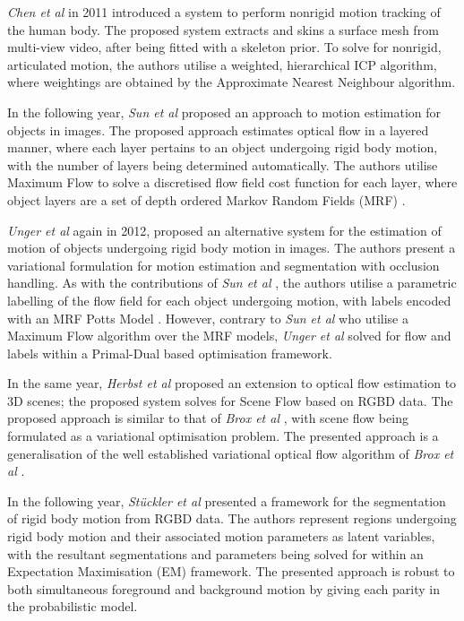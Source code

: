 {\textit{Chen et al} \cite{Chen2011} in 2011 introduced a system to perform nonrigid motion 
tracking of the human body. The proposed system extracts and skins a surface mesh from 
multi-view video, after being fitted with a skeleton prior. To solve for nonrigid, articulated 
motion, the authors utilise a weighted, hierarchical ICP algorithm, where weightings are obtained 
by the Approximate Nearest Neighbour \cite{Indyk2000} algorithm.

In the following year, \textit{Sun et al} \cite{Sun2012} proposed an approach to motion estimation 
for objects in images. The proposed approach estimates optical flow in a layered manner, where each 
layer pertains to an object undergoing rigid body motion, with the number of layers being determined 
automatically. The authors utilise Maximum Flow \cite{Lamich2017} to solve a discretised flow field cost 
function for each layer, where object layers are a set of depth ordered Markov Random Fields (MRF) 
\cite{BishopPRML, Murphy2012ML}.

\textit{Unger et al} \cite{Unger2012} again in 2012, proposed an alternative system for the 
estimation of motion of objects undergoing rigid body motion in images. The authors present a 
variational formulation for motion estimation and segmentation with occlusion handling. As with 
the contributions of \textit{Sun et al} \cite{Sun2012}, the authors utilise a parametric labelling 
of the flow field for each object undergoing motion, with labels encoded with an MRF Potts Model 
\cite{Levada2008}. However, contrary to \textit{Sun et al} \cite{Sun2012} who utilise a Maximum Flow 
algorithm over the MRF models, \textit{Unger et al} solved for flow and labels within a Primal-Dual 
\cite{Boyd2004Convex} based optimisation framework.

In the same year, \textit{Herbst et al} \cite{Herbst2013} proposed an extension to optical 
flow estimation to 3D scenes; the proposed system solves for Scene Flow based on RGBD data. 
The proposed approach is similar to that of \textit{Brox et al} \cite{Brox2004}, with scene flow 
being formulated as a variational optimisation problem. The presented approach is a generalisation 
of the well established variational optical flow algorithm of \textit{Brox et al} \cite{Brox2004}.

In the following year, \textit{St{\"u}ckler et al} \cite{Stueckler2013} presented a framework 
for the segmentation of rigid body motion from RGBD data. The authors represent regions undergoing 
rigid body motion and their associated motion parameters as latent variables, with the resultant 
segmentations and parameters being solved for within an Expectation Maximisation (EM) 
\cite{BishopPRML, Murphy2012ML} framework. The presented approach is robust to both simultaneous 
foreground and background motion by giving each parity in the probabilistic model.

}
